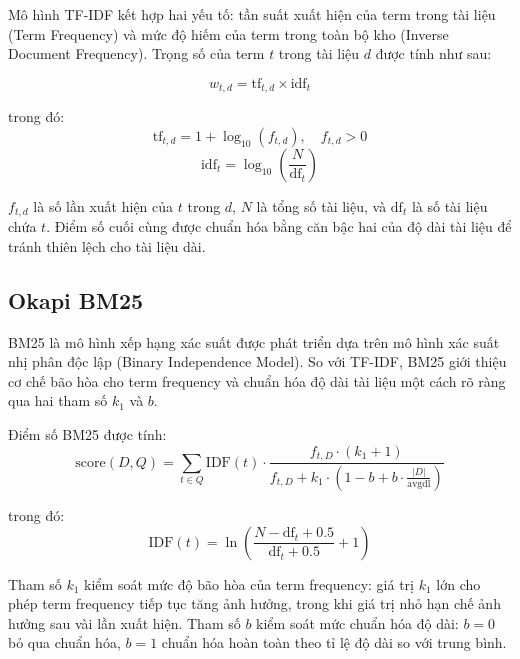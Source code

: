 \documentclass[12pt,a4paper,twoside]{article}
\begin{document}
Mô hình TF-IDF kết hợp hai yếu tố: tần suất xuất hiện của term trong tài liệu (Term Frequency) và mức độ hiếm của term trong toàn bộ kho (Inverse Document Frequency). Trọng số của term $t$ trong tài liệu $d$ được tính như sau:

\begin{equation}
w_{t,d} = \text{tf}_{t,d} \times \text{idf}_t
\end{equation}

trong đó:
\begin{equation}
\text{tf}_{t,d} = 1 + \log_{10}(f_{t,d}), \quad f_{t,d} > 0
\end{equation}
\begin{equation}
\text{idf}_t = \log_{10}\left(\frac{N}{\text{df}_t}\right)
\end{equation}

$f_{t,d}$ là số lần xuất hiện của $t$ trong $d$, $N$ là tổng số tài liệu, và $\text{df}_t$ là số tài liệu chứa $t$. Điểm số cuối cùng được chuẩn hóa bằng căn bậc hai của độ dài tài liệu để tránh thiên lệch cho tài liệu dài.

\subsection{Okapi BM25}

BM25 là mô hình xếp hạng xác suất được phát triển dựa trên mô hình xác suất nhị phân độc lập (Binary Independence Model). So với TF-IDF, BM25 giới thiệu cơ chế bão hòa cho term frequency và chuẩn hóa độ dài tài liệu một cách rõ ràng qua hai tham số $k_1$ và $b$.

Điểm số BM25 được tính:
\begin{equation}
\text{score}(D, Q) = \sum_{t \in Q} \text{IDF}(t) \cdot \frac{f_{t,D} \cdot (k_1 + 1)}{f_{t,D} + k_1 \cdot \left(1 - b + b \cdot \frac{|D|}{\text{avgdl}}\right)}
\end{equation}

trong đó:
\begin{equation}
\text{IDF}(t) = \ln\left(\frac{N - \text{df}_t + 0.5}{\text{df}_t + 0.5} + 1\right)
\end{equation}

Tham số $k_1$ kiểm soát mức độ bão hòa của term frequency: giá trị $k_1$ lớn cho phép term frequency tiếp tục tăng ảnh hưởng, trong khi giá trị nhỏ hạn chế ảnh hưởng sau vài lần xuất hiện. Tham số $b$ kiểm soát mức chuẩn hóa độ dài: $b = 0$ bỏ qua chuẩn hóa, $b = 1$ chuẩn hóa hoàn toàn theo tỉ lệ độ dài so với trung bình.
\end{document}
